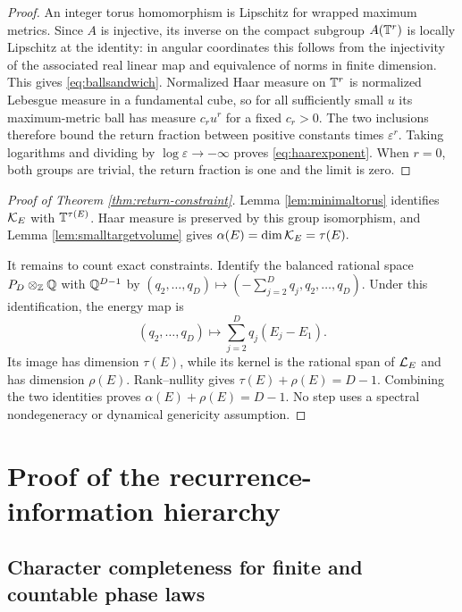 \begin{proof}
An integer torus homomorphism is Lipschitz for wrapped maximum metrics.  Since
$A$ is injective, its inverse on the compact subgroup $A(\mathbb T^r)$ is locally
Lipschitz at the identity: in angular coordinates this follows from the
injectivity of the associated real linear map and equivalence of norms in
finite dimension.  This gives \eqref{eq:ballsandwich}.  Normalized Haar
measure on $\mathbb T^r$ is normalized Lebesgue measure in a fundamental cube, so
for all sufficiently small $u$ its maximum-metric ball has measure
$c_r u^r$ for a fixed $c_r>0$.  The two inclusions therefore bound the return
fraction between positive constants times $\varepsilon^r$.  Taking logarithms
and dividing by $\log\varepsilon\to-\infty$ proves
\eqref{eq:haarexponent}.  When $r=0$, both groups are trivial, the return
fraction is one and the limit is zero.
\end{proof}

\begin{proof}[Proof of Theorem \ref{thm:return-constraint}]
Lemma \ref{lem:minimaltorus} identifies $\mathcal K_E$ with $\mathbb T^{\tau(E)}$.
Haar measure is preserved by this group isomorphism, and Lemma
\ref{lem:smalltargetvolume} gives
\(
 \alpha(E)=\dim\mathcal K_E=\tau(E).
\)

It remains to count exact constraints.  Identify the balanced rational space
\(
 P_D\otimes_{\mathbb Z}\mathbb Q
\)
with $\mathbb Q^{D-1}$ by
\(
 (q_2,\ldots,q_D)\mapsto(-\sum_{j=2}^Dq_j,q_2,\ldots,q_D).
\)
Under this identification, the energy map is
\begin{equation}
 (q_2,\ldots,q_D)\longmapsto
 \sum_{j=2}^Dq_j(E_j-E_1).                            \label{eq:rationalenergymap}
\end{equation}
Its image has dimension $\tau(E)$, while its kernel is the rational span of
$\mathcal L_E$ and has dimension $\rho(E)$.  Rank--nullity gives
\(
 \tau(E)+\rho(E)=D-1.
\)
Combining the two identities proves
\(
 \alpha(E)+\rho(E)=D-1.
\)
No step uses a spectral nondegeneracy or dynamical genericity assumption.
\end{proof}

\section{Proof of the recurrence-information hierarchy}

\subsection{Character completeness for finite and countable phase laws}

